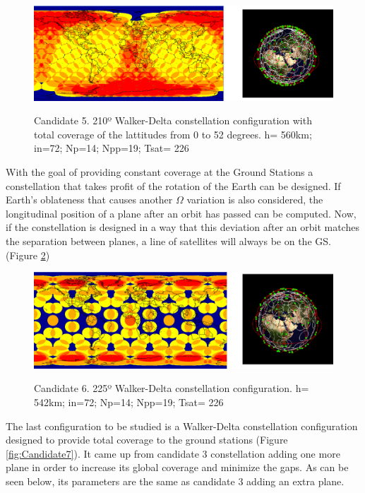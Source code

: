 \begin{figure}[H]%
	\centering
	\includegraphics[width=1\textwidth]{Candidate5.png}\\
	\caption{Candidate 5. 210º Walker-Delta constellation configuration with total coverage of the lattitudes from 0 to 52 degrees.
			 h= 560km; in=72; Np=14; Npp=19; Tsat= 226} 
	\label{fig:Candidate5}
\end{figure}


With the goal of providing constant coverage at the Ground Stations a constellation that takes profit of the rotation of the Earth can be designed. If Earth's oblateness that causes another $\Omega$ variation  is also considered, the longitudinal position of a plane after an orbit has passed can be computed. Now, if the constellation is designed in a way that this deviation after an orbit matches the separation between planes, a line of satellites will always be on the GS. (Figure \ref{fig:Candidate6})

\begin{figure}[H]%
	\centering
	\includegraphics[width=1\textwidth]{Candidate6.png}\\
	\caption{Candidate 6. 225º Walker-Delta constellation configuration. h= 542km; in=72; Np=14; Npp=19; Tsat= 226}
	\label{fig:Candidate6}
\end{figure}


The last configuration to be studied is a Walker-Delta constellation configuration designed to provide total coverage to the ground stations (Figure \ref{fig:Candidate7}). It came up from candidate 3 constellation adding one more plane in order to increase its global coverage and minimize the gaps. As can be seen below, its parameters are the same as candidate 3 adding an extra plane.

